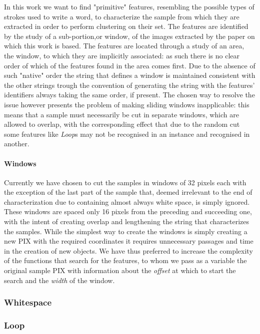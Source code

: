 \documentclass[a4paper,12pt]{article}
\begin{document}
In this work we want to find "primitive" features, resembling the possible types of strokes used to write a word, to characterize the sample from which they are extracted in order to perform clustering on their set.
The features are identified by the study of a sub-portion,or window, of the images extracted by the paper on which this work is based.
The features are located through a study of an area, the window, to which they are implicitly associated: as such there is no clear order of which of the features found in the area comes first.
Due to the absence of such "native" order the string that defines a window is maintained consistent with the other strings trough the convention of generating the string with the features' identifiers always taking the same order, if present.
The chosen way to resolve the issue however presents the problem of making sliding windows inapplicable: this means that a sample must necessarily be cut in separate windows, which are allowed to overlap, with the corresponding effect that due to the random cut some features like \textit{Loop}s may not be recognised in an instance and recognised in another. 

\paragraph{Windows}
Currently we have chosen to cut the samples in windows of 32 pixels each with the exception of the last part of the sample that, deemed irrelevant to the end of characterization due to containing almost always white space, is simply ignored.
These windows are spaced only 16 pixels from the preceding and succeeding one, with the intent of creating overlap and lengthening the string that characterizes the samples.
While the simplest way to create the windows is simply creating a new PIX with the required coordinates it requires unnecessary passages and time in the creation of new objects. We have thus preferred to increase the complexity of the functions that search for the features, to whom we pass as a variable the original sample PIX with information about the \textit{offset} at which to start the search and the \textit{width} of the window.


\subsubsection{Whitespace}  

\subsubsection{Loop}
\end{document}

